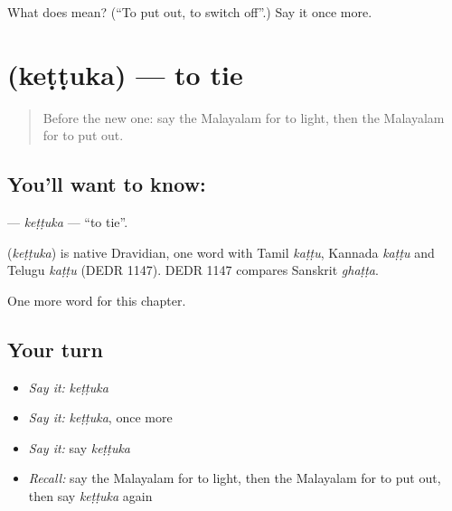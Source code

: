 \begin{tcolorbox}[breakable,colback=teal!4,colframe=teal!35!black,title={Before you move on}]
What does  mean? (\textquotedblleft{}To put out, to switch off\textquotedblright{}.) Say it once more.
\end{tcolorbox}
\section[\texorpdfstring{\ml{കെട്ടുക} (keṭṭuka)}{കെട്ടുക (keṭṭuka)}]{ (keṭṭuka) — to tie}

\label{lesson:ML-C265-kettuka}



\begin{quote}
Before the new one: say the Malayalam for to light, then the Malayalam for to put out.
\end{quote}

\subsection*{You'll want to know: }
\textbf{} — \emph{keṭṭuka} — \textquotedblleft{}to tie\textquotedblright{}.

\begin{cousinweb}
\textbf{} (\emph{keṭṭuka}) is native Dravidian, one word with Tamil \emph{kaṭṭu}, Kannada \emph{kaṭṭu} and Telugu \emph{kaṭṭu} (DEDR 1147). DEDR 1147 compares Sanskrit \emph{ghaṭṭa}.
\end{cousinweb}

\begin{grammarlens}[title={What you've built}]
One more word for this chapter.
\end{grammarlens}

\subsection*{Your turn}
\begin{itemize}
\raggedright
  \item \emph{Say it:} \emph{keṭṭuka}
  \item \emph{Say it:} \emph{keṭṭuka}, once more
  \item \emph{Say it:} say \emph{keṭṭuka}
  \item \emph{Recall:} say the Malayalam for to light, then the Malayalam for to put out, then say \emph{keṭṭuka} again
\end{itemize}


